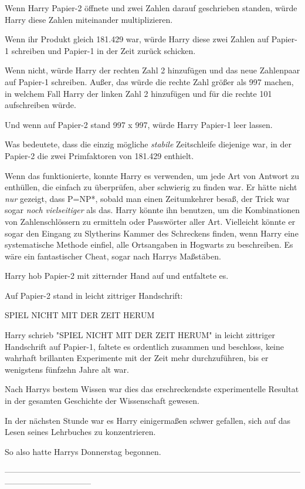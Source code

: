 {Wenn Harry Papier-2 öffnete und zwei Zahlen darauf geschrieben standen, würde Harry diese Zahlen miteinander multiplizieren.

Wenn ihr Produkt gleich 181.429 war, würde Harry diese zwei Zahlen auf Papier-1 schreiben und Papier-1 in der Zeit zurück schicken.

Wenn nicht, würde Harry der rechten Zahl 2 hinzufügen und das neue Zahlenpaar auf Papier-1 schreiben. Außer, das würde die rechte Zahl größer als 997 machen, in welchem Fall Harry der linken Zahl 2 hinzufügen und für die rechte 101 aufschreiben würde.

Und wenn auf Papier-2 stand 997 x 997, würde Harry Papier-1 leer lassen.

Was bedeutete, dass die einzig mögliche \emph{stabile} Zeitschleife diejenige war, in der Papier-2 die zwei Primfaktoren von 181.429 enthielt.

Wenn das funktionierte, konnte Harry es verwenden, um jede Art von Antwort zu enthüllen, die einfach zu überprüfen, aber schwierig zu finden war. Er hätte nicht \emph{nur} gezeigt, dass P=NP*, sobald man einen Zeitumkehrer besaß, der Trick war sogar \emph{noch vielseitiger} als das. Harry könnte ihn benutzen, um die Kombinationen von Zahlenschlössern zu ermitteln oder Passwörter aller Art. Vielleicht könnte er sogar den Eingang zu Slytherins Kammer des Schreckens finden, wenn Harry eine systematische Methode einfiel, alle Ortsangaben in Hogwarts zu beschreiben. Es wäre ein fantastischer Cheat, sogar nach Harrys Maßstäben.

Harry hob Papier-2 mit zitternder Hand auf und entfaltete es.

Auf Papier-2 stand in leicht zittriger Handschrift:

SPIEL NICHT MIT DER ZEIT HERUM

Harry schrieb "SPIEL NICHT MIT DER ZEIT HERUM" in leicht zittriger Handschrift auf Papier-1, faltete es ordentlich zusammen und beschloss, keine wahrhaft brillanten Experimente mit der Zeit mehr durchzuführen, bis er wenigstens fünfzehn Jahre alt war.

Nach Harrys bestem Wissen war dies das erschreckendste experimentelle Resultat in der gesamten Geschichte der Wissenschaft gewesen.

In der nächsten Stunde war es Harry einigermaßen schwer gefallen, sich auf das Lesen seines Lehrbuches zu konzentrieren.

So also hatte Harrys Donnerstag begonnen.

--------------------------------------------------------------------------------------------------------------------------------------------

}

